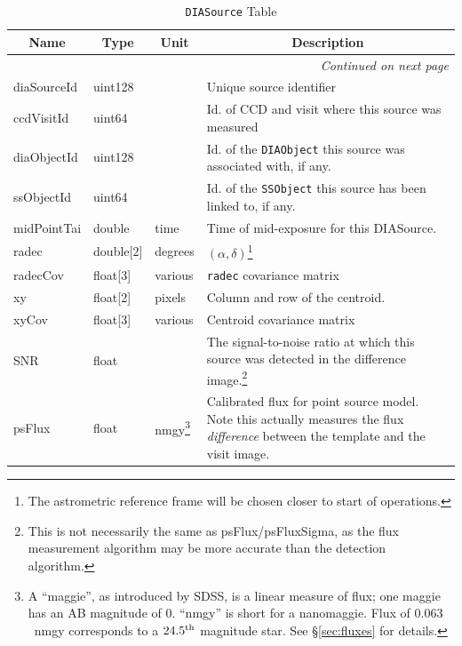 \documentclass[12pt]{article}
\newcommand{\code}[1]{\texttt{#1}}
\newcommand{\DIASource}{\code{DIASource}\xspace}
\newcommand{\DIAObject}{\code{DIAObject}\xspace}
\newcommand{\SSObject}{\code{SSObject}\xspace}
\begin{document}
\begin{center}
\begin{longtable}{p{3cm}p{2cm}p{2cm}p{5cm}}
\caption[\DIASource Table]{\DIASource Table
} \\

\hline \multicolumn{1}{c}{\bf Name} & \multicolumn{1}{c}{\bf Type} & \multicolumn{1}{c}{\bf Unit} & \multicolumn{1}{c}{\bf Description} \\ \hline
\endhead

\hline \multicolumn{4}{r}{{\em Continued on next page}} \\
\endfoot

\hline\hline
\endlastfoot

diaSourceId & uint128 & ~ & Unique source identifier \\ 

ccdVisitId & uint64 & ~ & Id. of CCD and visit where this source was measured \\ 

diaObjectId & uint128 & ~ & Id. of the \DIAObject this source was associated with, if any. \\ 

ssObjectId & uint64 & ~ & Id. of the \SSObject this source has been linked to, if any. \\ 

midPointTai & double & time & Time of mid-exposure for this DIASource. \\ 

radec & double[2] & degrees & $(\alpha, \delta)$\footnote{The astrometric reference frame will be chosen closer to start of operations.} \\ 

radecCov & float[3] & various & \texttt{radec} covariance matrix \\ 

xy & float[2] & pixels & Column and row of the centroid. \\ 

xyCov & float[3] & various & Centroid covariance matrix \\ 

SNR & float & ~ & The signal-to-noise ratio at which this source was detected in the difference image.\footnote{This is not necessarily the same as psFlux/psFluxSigma, as the flux measurement algorithm may be more accurate than the detection algorithm.} \\

psFlux & float & nmgy\footnote{A ``maggie'', as introduced by SDSS, is a linear measure of flux; one maggie has an AB magnitude of 0. ``nmgy'' is short for a nanomaggie. Flux of $0.063$~nmgy corresponds to a $24.5^{\rm th}$ magnitude star. See \S \ref{sec:fluxes} for details.} & Calibrated flux for point source model. Note this actually measures the flux {\em difference} between the template and the visit image. \\ 


\end{longtable}
\end{center}
\end{document}
